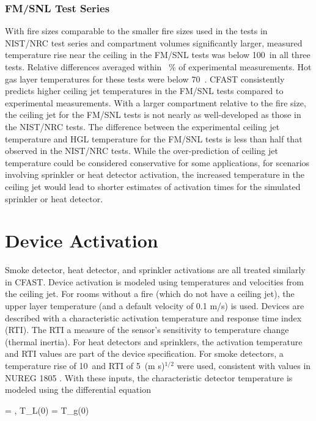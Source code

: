 \subsubsection{FM/SNL Test Series}

With fire sizes comparable to the smaller fire sizes used in the tests in NIST/NRC test series and compartment volumes significantly larger, measured temperature rise near the ceiling in the FM/SNL tests was below 100~\degc in all three tests. Relative differences averaged within \CeilingJetfmsnl~\% of experimental measurements.  Hot gas layer temperatures for these tests were below 70~\degc.  CFAST consistently predicts higher ceiling jet temperatures in the FM/SNL tests compared to experimental measurements.  With a larger compartment relative to the fire size, the ceiling jet for the FM/SNL tests is not nearly as well-developed as those in the NIST/NRC tests.  The difference between the experimental ceiling jet temperature and HGL temperature for the FM/SNL tests is less than half that observed in the NIST/NRC tests.  While the over-prediction of ceiling jet temperature could be considered conservative for some applications, for scenarios involving sprinkler or heat detector activation, the increased temperature in the ceiling jet would lead to shorter estimates of activation times for the simulated sprinkler or heat detector.

\section{Device Activation}

Smoke detector, heat detector, and sprinkler activations are all treated similarly in CFAST.  Device activation is modeled using temperatures and velocities from the ceiling jet.  For rooms without a fire (which do not have a ceiling jet), the upper layer temperature (and a default velocity of 0.1 m/s) is used.  Devices are described with a characteristic activation temperature and response time index (RTI). The RTI a measure of the sensor's sensitivity to temperature change (thermal inertia). For heat detectors and sprinklers, the activation temperature and RTI values are part of the device specification. For smoke detectors, a temperature rise of 10~\degc and RTI of 5~(m s)$^{1/2}$ were used, consistent with values in NUREG 1805 \cite{NRCNUREG1805}. With these inputs, the characteristic detector temperature is modeled using the differential equation \cite{Heskestad:1976}

\be {} =   \; , \; T_L(0) = T_g(0)  \ee

